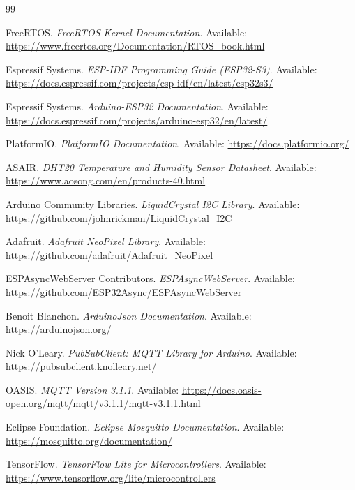 ﻿\newpage
\renewcommand{\refname}{Tài liệu tham khảo}
\renewcommand{\bibname}{Tài liệu tham khảo}

\begin{thebibliography}{99}

FreeRTOS. \textit{FreeRTOS Kernel Documentation}. Available: \url{https://www.freertos.org/Documentation/RTOS_book.html}

Espressif Systems. \textit{ESP-IDF Programming Guide (ESP32-S3)}. Available: \url{https://docs.espressif.com/projects/esp-idf/en/latest/esp32s3/}

Espressif Systems. \textit{Arduino-ESP32 Documentation}. Available: \url{https://docs.espressif.com/projects/arduino-esp32/en/latest/}

PlatformIO. \textit{PlatformIO Documentation}. Available: \url{https://docs.platformio.org/}

ASAIR. \textit{DHT20 Temperature and Humidity Sensor Datasheet}. Available: \url{https://www.aosong.com/en/products-40.html}

Arduino Community Libraries. \textit{LiquidCrystal I2C Library}. Available: \url{https://github.com/johnrickman/LiquidCrystal_I2C}

Adafruit. \textit{Adafruit NeoPixel Library}. Available: \url{https://github.com/adafruit/Adafruit_NeoPixel}

ESPAsyncWebServer Contributors. \textit{ESPAsyncWebServer}. Available: \url{https://github.com/ESP32Async/ESPAsyncWebServer}

Benoit Blanchon. \textit{ArduinoJson Documentation}. Available: \url{https://arduinojson.org/}

Nick O'Leary. \textit{PubSubClient: MQTT Library for Arduino}. Available: \url{https://pubsubclient.knolleary.net/}

OASIS. \textit{MQTT Version 3.1.1}. Available: \url{https://docs.oasis-open.org/mqtt/mqtt/v3.1.1/mqtt-v3.1.1.html}

Eclipse Foundation. \textit{Eclipse Mosquitto Documentation}. Available: \url{https://mosquitto.org/documentation/}

TensorFlow. \textit{TensorFlow Lite for Microcontrollers}. Available: \url{https://www.tensorflow.org/lite/microcontrollers}

\end{thebibliography}
